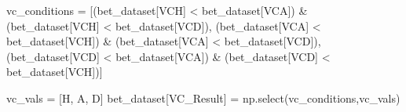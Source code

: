 \documentclass[
  letterpaper,
  DIV=11,
  numbers=noendperiod]{scrartcl}
\newenvironment{Shaded}{\begin{snugshade}}{\end{snugshade}}
\newcommand{\NormalTok}[1]{\textcolor[rgb]{0.00,0.23,0.31}{#1}}
\newcommand{\OperatorTok}[1]{\textcolor[rgb]{0.37,0.37,0.37}{#1}}
\newcommand{\StringTok}[1]{\textcolor[rgb]{0.13,0.47,0.30}{#1}}
\begin{document}
\begin{Shaded}
\begin{Highlighting}[]
\NormalTok{vc\_conditions }\OperatorTok{=}\NormalTok{ [(bet\_dataset[}\StringTok{\textquotesingle{}VCH\textquotesingle{}}\NormalTok{] }\OperatorTok{\textless{}}\NormalTok{ bet\_dataset[}\StringTok{\textquotesingle{}VCA\textquotesingle{}}\NormalTok{]) }\OperatorTok{\&}\NormalTok{ (bet\_dataset[}\StringTok{\textquotesingle{}VCH\textquotesingle{}}\NormalTok{] }\OperatorTok{\textless{}}\NormalTok{ bet\_dataset[}\StringTok{\textquotesingle{}VCD\textquotesingle{}}\NormalTok{]),}
\NormalTok{                   (bet\_dataset[}\StringTok{\textquotesingle{}VCA\textquotesingle{}}\NormalTok{] }\OperatorTok{\textless{}}\NormalTok{ bet\_dataset[}\StringTok{\textquotesingle{}VCH\textquotesingle{}}\NormalTok{]) }\OperatorTok{\&}\NormalTok{ (bet\_dataset[}\StringTok{\textquotesingle{}VCA\textquotesingle{}}\NormalTok{] }\OperatorTok{\textless{}}\NormalTok{ bet\_dataset[}\StringTok{\textquotesingle{}VCD\textquotesingle{}}\NormalTok{]),}
\NormalTok{                   (bet\_dataset[}\StringTok{\textquotesingle{}VCD\textquotesingle{}}\NormalTok{] }\OperatorTok{\textless{}}\NormalTok{ bet\_dataset[}\StringTok{\textquotesingle{}VCA\textquotesingle{}}\NormalTok{]) }\OperatorTok{\&}\NormalTok{ (bet\_dataset[}\StringTok{\textquotesingle{}VCD\textquotesingle{}}\NormalTok{] }\OperatorTok{\textless{}}\NormalTok{ bet\_dataset[}\StringTok{\textquotesingle{}VCH\textquotesingle{}}\NormalTok{])]}

\NormalTok{vc\_vals }\OperatorTok{=}\NormalTok{ [}\StringTok{\textquotesingle{}H\textquotesingle{}}\NormalTok{, }\StringTok{\textquotesingle{}A\textquotesingle{}}\NormalTok{, }\StringTok{\textquotesingle{}D\textquotesingle{}}\NormalTok{]}
\NormalTok{bet\_dataset[}\StringTok{\textquotesingle{}VC\_Result\textquotesingle{}}\NormalTok{] }\OperatorTok{=}\NormalTok{ np.select(vc\_conditions,vc\_vals)}
\end{Highlighting}
\end{Shaded}
\end{document}
